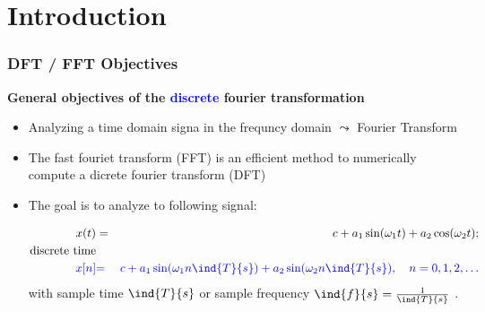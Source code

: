 \section{Introduction}
 \begin{frame}
 \frametitle{DFT / FFT Objectives}
{\bf General objectives of the \textcolor{blue}{discrete} fourier transformation}
\begin{itemize}
  \item Analyzing a time domain signa in the frequncy domain $\leadsto$ Fourier Transform
   \item The fast fouriet transform (FFT) is an efficient method to numerically compute a dicrete fourier transform (DFT)

   
  \item     The goal is to analyze to following signal:

 \begin{eqnarray*}
   x(t) &=& c+ a_1 \sin(\omega_1 t) + a_2 \cos(\omega_2 t);
  \\          
   \text{discrete time}
   \\
  \textcolor{blue}{
   x[n]}       &\textcolor{blue}{=}&  \textcolor{blue}{c + a_1 \sin(\omega_1 n \ind{T}{s}) + a_2 \sin(\omega_2 n \ind{T}{s}), \quad n=0,1,2,\ldots
    }
  \end{eqnarray*}
with sample time $\ind{T}{s}$ or sample frequency $\ind{f}{s} = \frac{1}{\ind{T}{s}}$ .
\end{itemize}

\end{frame}


